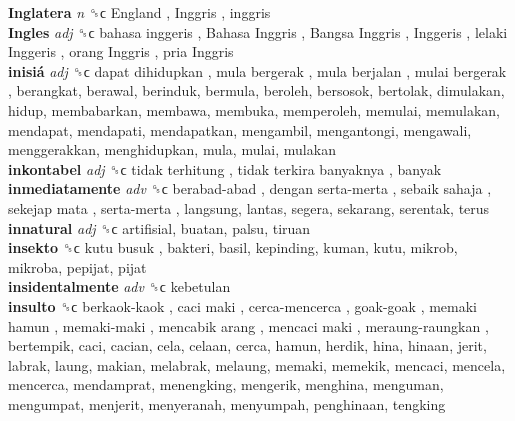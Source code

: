 \textbf{Inglatera} \emph{n}  ␝ϲ   England ,  Inggris , inggris  \\
\textbf{Ingles} \emph{adj}  ␝ϲ   bahasa inggeris ,  Bahasa Inggris ,  Bangsa Inggris ,  Inggeris ,  lelaki Inggeris ,  orang Inggris ,  pria Inggris   \\
\textbf{inisiá} \emph{adj}  ␝ϲ   dapat dihidupkan ,  mula bergerak ,  mula berjalan ,  mulai bergerak , berangkat, berawal, berinduk, bermula, beroleh, bersosok, bertolak, dimulakan, hidup, membabarkan, membawa, membuka, memperoleh, memulai, memulakan, mendapat, mendapati, mendapatkan, mengambil, mengantongi, mengawali, menggerakkan, menghidupkan, mula, mulai, mulakan  \\
\textbf{inkontabel} \emph{adj}  ␝ϲ   tidak terhitung ,  tidak terkira banyaknya , banyak  \\
\textbf{inmediatamente} \emph{adv}  ␝ϲ   berabad-abad ,  dengan serta-merta ,  sebaik sahaja ,  sekejap mata ,  serta-merta , langsung, lantas, segera, sekarang, serentak, terus  \\
\textbf{innatural} \emph{adj}  ␝ϲ  artifisial, buatan, palsu, tiruan  \\
\textbf{insekto} ␝ϲ   kutu busuk , bakteri, basil, kepinding, kuman, kutu, mikrob, mikroba, pepijat, pijat  \\
\textbf{insidentalmente} \emph{adv}  ␝ϲ  kebetulan  \\
\textbf{insulto} ␝ϲ   berkaok-kaok ,  caci maki ,  cerca-mencerca ,  goak-goak ,  memaki hamun ,  memaki-maki ,  mencabik arang ,  mencaci maki ,  meraung-raungkan , bertempik, caci, cacian, cela, celaan, cerca, hamun, herdik, hina, hinaan, jerit, labrak, laung, makian, melabrak, melaung, memaki, memekik, mencaci, mencela, mencerca, mendamprat, menengking, mengerik, menghina, menguman, mengumpat, menjerit, menyeranah, menyumpah, penghinaan, tengking  \\
